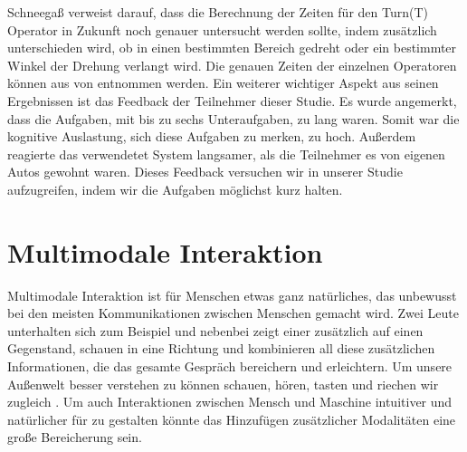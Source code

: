 Schneegaß verweist darauf, dass die Berechnung der Zeiten für den Turn(T) Operator in Zukunft noch genauer untersucht werden sollte, indem zusätzlich unterschieden wird, ob in einen bestimmten Bereich gedreht oder ein bestimmter Winkel der Drehung verlangt wird. 
Die genauen Zeiten der einzelnen Operatoren können aus  von \citet[Seite 75]{SchneegaB_2011} entnommen werden. 
Ein weiterer wichtiger Aspekt aus seinen Ergebnissen ist das Feedback der Teilnehmer dieser Studie. Es wurde angemerkt, dass die Aufgaben, mit bis zu sechs Unteraufgaben, zu lang waren. 
Somit war die kognitive Auslastung, sich diese Aufgaben zu merken, zu hoch. 
Außerdem reagierte das verwendetet System langsamer, als die Teilnehmer es von eigenen Autos gewohnt waren. 
Dieses Feedback versuchen wir in unserer Studie aufzugreifen, indem wir die Aufgaben möglichst kurz halten. 

\section[Multimodale Interaktion]{Multimodale Interaktion}
Multimodale Interaktion ist für Menschen etwas ganz natürliches, das unbewusst bei den meisten Kommunikationen zwischen Menschen gemacht wird. 
Zwei Leute unterhalten sich zum Beispiel und nebenbei zeigt einer zusätzlich auf einen Gegenstand, schauen in eine Richtung und kombinieren all diese zusätzlichen Informationen, die das gesamte Gespräch bereichern und erleichtern. 
Um unsere Außenwelt besser verstehen zu können schauen, hören, tasten und riechen wir zugleich \citep{sharma1998toward}. 
Um auch Interaktionen zwischen Mensch und Maschine intuitiver und natürlicher für zu gestalten könnte das Hinzufügen zusätzlicher Modalitäten eine große Bereicherung sein.

